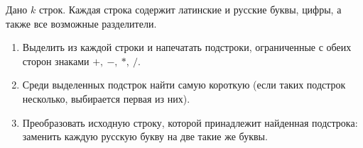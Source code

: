 Дано \(k\) строк. Каждая строка содержит латинские и русские буквы, цифры, а также все возможные разделители.
\begin{enumerate}
    \item Выделить из каждой строки и напечатать подстроки, ограниченные с обеих сторон знаками \(+,\ -,\ *,\ /\). 
    \item Среди выделенных подстрок найти самую короткую (если таких подстрок несколько, выбирается первая из них).
    \item Преобразовать исходную строку, которой принадлежит найденная подстрока: заменить каждую русскую букву на две такие же буквы.
\end{enumerate}